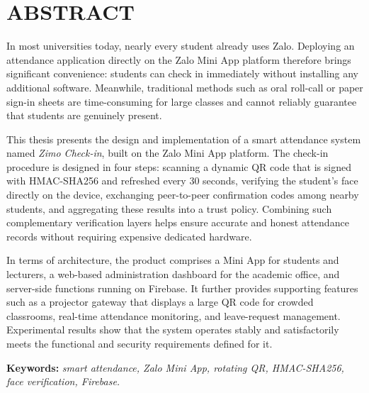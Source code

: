 \documentclass[../main.tex]{subfiles}
\begin{document}
\chapter*{ABSTRACT}
\thispagestyle{plain}

In most universities today, nearly every student already uses Zalo. Deploying an attendance
application directly on the Zalo Mini App platform therefore brings significant convenience:
students can check in immediately without installing any additional software. Meanwhile,
traditional methods such as oral roll-call or paper sign-in sheets are time-consuming for large
classes and cannot reliably guarantee that students are genuinely present.

This thesis presents the design and implementation of a smart attendance system named
\textit{Zimo Check-in}, built on the Zalo Mini App platform. The check-in procedure is designed
in four steps: scanning a dynamic QR code that is signed with HMAC-SHA256 and refreshed every
30 seconds, verifying the student's face directly on the device, exchanging peer-to-peer
confirmation codes among nearby students, and aggregating these results into a trust policy.
Combining such complementary verification layers helps ensure accurate and honest attendance
records without requiring expensive dedicated hardware.

In terms of architecture, the product comprises a Mini App for students and lecturers, a
web-based administration dashboard for the academic office, and server-side functions running on
Firebase. It further provides supporting features such as a projector gateway that displays a
large QR code for crowded classrooms, real-time attendance monitoring, and leave-request
management. Experimental results show that the system operates stably and satisfactorily meets
the functional and security requirements defined for it.

\vspace{1em}
\noindent\textbf{Keywords:} \textit{smart attendance, Zalo Mini App, rotating QR, HMAC-SHA256, face verification, Firebase.}
\end{document}
